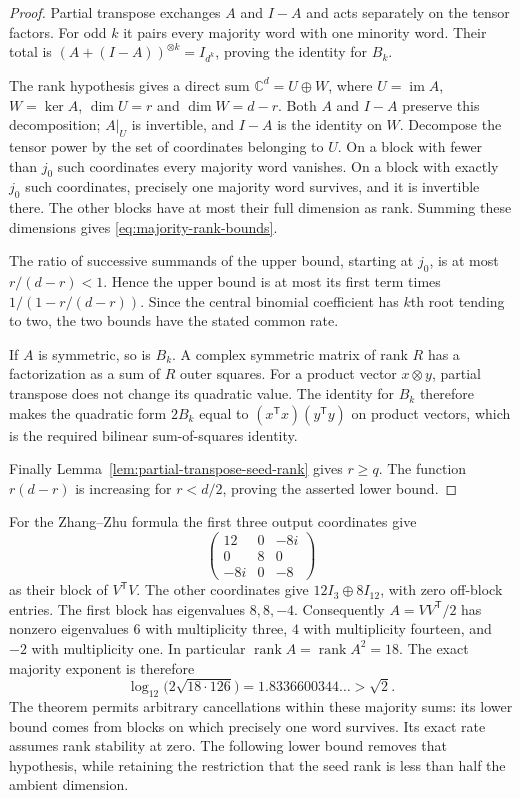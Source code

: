 \begin{proof}
Partial transpose exchanges $A$ and $I-A$ and acts separately on
the tensor factors. For odd $k$ it pairs every majority word with
one minority word. Their total is
$(A+(I-A))^{\otimes k}=I_{d^k}$, proving the identity for $B_k$.

The rank hypothesis gives a direct sum
$\mathbb C^d=U\oplus W$, where $U=\operatorname{im}A$,
$W=\ker A$, $\dim U=r$ and $\dim W=d-r$.
Both $A$ and $I-A$ preserve this decomposition; $A|_U$ is invertible,
and $I-A$ is the identity on $W$. Decompose the tensor power by the
set of coordinates belonging to $U$. On a block with fewer than
$j_0$ such coordinates every majority word vanishes. On a block
with exactly $j_0$ such coordinates, precisely one majority word
survives, and it is invertible there. The other blocks have at most
their full dimension as rank. Summing these dimensions gives
\eqref{eq:majority-rank-bounds}.

The ratio of successive summands of the upper bound, starting at
$j_0$, is at most $r/(d-r)<1$. Hence the upper bound is at most its
first term times $1/(1-r/(d-r))$. Since the central binomial
coefficient has $k$th root tending to two, the two bounds have the
stated common rate.

If $A$ is symmetric, so is $B_k$. A complex symmetric matrix of rank
$R$ has a factorization as a sum of $R$ outer squares. For a product
vector $x\otimes y$, partial transpose does not change its quadratic
value. The identity for $B_k$ therefore makes the quadratic form
$2B_k$ equal to $(x^{\mathsf T}x)(y^{\mathsf T}y)$ on product vectors,
which is the required bilinear sum-of-squares identity.

Finally Lemma~\ref{lem:partial-transpose-seed-rank} gives $r\ge q$.
The function $r(d-r)$ is increasing for $r<d/2$, proving the
asserted lower bound.
\end{proof}

For the Zhang--Zhu formula the first three output coordinates give
\[
 \begin{pmatrix}12&0&-8i\\0&8&0\\-8i&0&-8\end{pmatrix}
\]
as their block of $V^{\mathsf T}V$. The other coordinates give
$12I_3\oplus8I_{12}$, with zero off-block entries. The first block
has eigenvalues $8,8,-4$. Consequently $A=VV^{\mathsf T}/2$ has
nonzero eigenvalues $6$ with multiplicity three, $4$ with multiplicity
fourteen, and $-2$ with multiplicity one. In particular
$\operatorname{rank}A=\operatorname{rank}A^2=18$.
The exact majority exponent is therefore
\[
 \log_{12}\bigl(2\sqrt{18\cdot126}\bigr)
       =1.8336600344\ldots>\sqrt2.
\]
The theorem permits arbitrary cancellations within these majority
sums: its lower bound comes from blocks on which precisely one word
survives. Its exact rate assumes rank stability at zero. The following
lower bound removes that hypothesis, while retaining the restriction
that the seed rank is less than half the ambient dimension.

